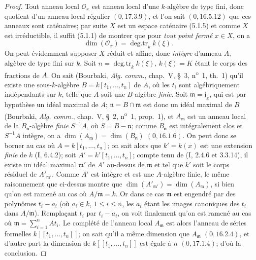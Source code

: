 \begin{proof}
Tout anneau local $\mathcal O_x$ est anneau local d'une $k$-algèbre de type
fini, donc quotient d'un anneau local régulier $(0,17.3.9)$, et l'on sait
$(0,16.5.12)$ que ces anneaux sont caténaires; par suite $X$ est un espace
caténaire (5.1.5) et comme $X$ est irréductible, il suffit (5.1.1) de montrer
que pour \emph{tout point fermé} $x\in X$, on a
\begin{equation}
\dim(\mathcal O_x)=\operatorname{deg.tr}_k k(\xi).
\tag{5.2.1.1}\label{IV.2.5.2.1.1-fr}
\end{equation}
On peut évidemment supposer $X$ réduit et affine, donc \emph{intègre}
d'anneau $A$, algèbre de type fini sur $k$. Soit
$n=\operatorname{deg.tr}_k k(\xi)$, $k(\xi)=K$ étant le corps des fractions
de $A$. On sait (Bourbaki, \emph{Alg. comm.}, chap.~V, \S~3,
n\textsuperscript{o}~1, th.~1) qu'il existe une sous-$k$-algèbre
$B=k[t_1,\ldots,t_n]$ de $A$, où les $t_i$ sont algébriquement indépendants
sur $k$, telle que $A$ soit une $B$-algèbre \emph{finie}. Soit
$\mathfrak m=\mathfrak j_x$, qui est par hypothèse un idéal maximal de $A$;
$\mathfrak n=B\cap\mathfrak m$ est donc un idéal maximal de $B$ (Bourbaki,
\emph{Alg. comm.}, chap.~V, \S~2, n\textsuperscript{o}~1, prop.~1), et
$A_{\mathfrak m}$ est un anneau local de la $B_{\mathfrak n}$-algèbre
\emph{finie} $S^{-1}A$, où $S=B-\mathfrak n$; comme $B_{\mathfrak n}$ est
intégralement clos et $S^{-1}A$ intègre, on a
$\dim(A_{\mathfrak m})=\dim(B_{\mathfrak n})$ $(0,16.1.6)$. On peut donc se
borner au cas où $A=k[t_1,\ldots,t_n]$; on sait alors que
$k'=k(x)$ est une extension \emph{finie} de $k$ (I, 6.4.2); soit
$A'=k'[t_1,\ldots,t_n]$; compte tenu de (I, 2.4.6 et 3.3.14), il existe un
idéal maximal $\mathfrak m'$ de $A'$ au-dessus de $\mathfrak m$ et tel que
$k'$ soit le corps résiduel de $A'_{\mathfrak m'}$. Comme $A'$ est intègre et
est une $A$-algèbre finie, le même raisonnement que ci-dessus montre que
$\dim(A'_{\mathfrak m'})=\dim(A_{\mathfrak m})$, si bien qu'on est ramené au
cas où $A/\mathfrak m=k$. Or dans ce cas $\mathfrak m$ est engendré par des
polynômes $t_i-a_i$ (où $a_i\in k$, $1\leq i\leq n$, les $a_i$ étant les
images canoniques des $t_i$ dans $A/\mathfrak m$). Remplaçant $t_i$ par
$t_i-a_i$, on voit finalement qu'on est ramené au cas où
$\mathfrak m=\sum_{i=1}^nAt_i$. Le complété de l'anneau local
$A_{\mathfrak m}$ est alors l'anneau de séries formelles
$k[[t_1,\ldots,t_n]]$; on sait qu'il a même dimension que $A_{\mathfrak m}$
$(0,16.2.4)$, et d'autre part la dimension de $k[[t_1,\ldots,t_n]]$ est égale
à $n$ $(0,17.1.4)$; d'où la conclusion.
\end{proof}

